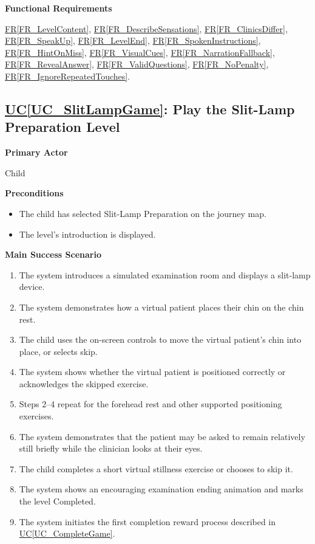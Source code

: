 \documentclass[12pt]{article}
\newcounter{ucnum} %
\newcommand{\ucref}[1]{\hyperref[#1]{UC\ref*{#1}}}
\newcommand{\rref}[1]{\hyperref[#1]{FR\ref*{#1}}}
\begin{document}
\textbf{Functional Requirements}

\rref{FR_LevelContent}, \rref{FR_DescribeSensations}, \rref{FR_ClinicsDiffer}, \rref{FR_SpeakUp}, \rref{FR_LevelEnd}, \rref{FR_SpokenInstructions}, \rref{FR_HintOnMiss}, \rref{FR_VisualCues}, \rref{FR_NarrationFallback}, \rref{FR_RevealAnswer}, \rref{FR_ValidQuestions}, \rref{FR_NoPenalty}, \rref{FR_IgnoreRepeatedTouches}.

\label{UC_SlitLampGame}
\subsection{\ucref{UC_SlitLampGame}: Play the Slit-Lamp Preparation Level}

\textbf{Primary Actor}

Child

\textbf{Preconditions}
\begin{itemize}
    \item The child has selected Slit-Lamp Preparation on the journey map.
    \item The level's introduction is displayed.
\end{itemize}

\textbf{Main Success Scenario}
\begin{enumerate}
    \item The system introduces a simulated examination room and
    displays a slit-lamp device.
    \item The system demonstrates how a virtual patient places
    their chin on the chin rest.
    \item The child uses the on-screen controls to move the
    virtual patient's chin into place, or selects skip.
    \item The system shows whether the virtual patient is positioned
    correctly or acknowledges the skipped exercise.
    \item Steps 2--4 repeat for the forehead rest and other
    supported positioning exercises.
    \item The system demonstrates that the patient may be asked
    to remain relatively still briefly while the clinician looks
    at their eyes.
    \item The child completes a short virtual stillness exercise
    or chooses to skip it.
    \item The system shows an encouraging examination ending
    animation and marks the level Completed.
    \item The system initiates the first completion reward process
    described in \ucref{UC_CompleteGame}.
\end{enumerate}
\end{document}
